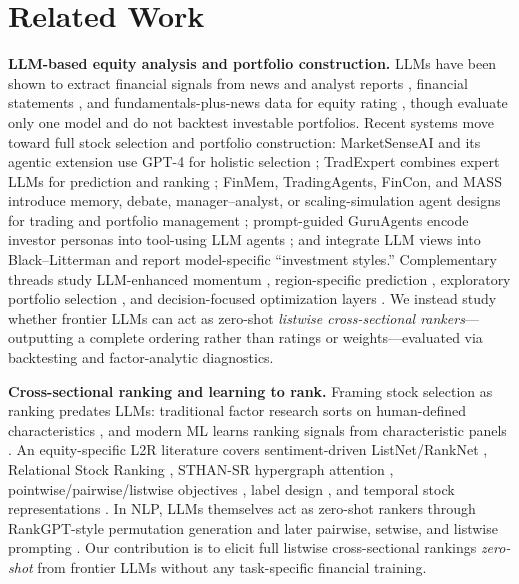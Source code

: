 \section{Related Work}

\textbf{LLM-based equity analysis and portfolio construction.}
LLMs have been shown to extract financial signals from news and analyst reports \citep{lopez2023chatgpt,kim2023llmanalysts}, financial statements \citep{kim2024llmforecast}, and fundamentals-plus-news data for equity rating \citep{papasotiriou2024ai}, though \citeauthor{papasotiriou2024ai} evaluate only one model and do not backtest investable portfolios.
Recent systems move toward full stock selection and portfolio construction: MarketSenseAI and its agentic extension use GPT-4 for holistic selection \citep{fatouros2024marketsenseai,fatouros2025marketsenseai2}; TradExpert combines expert LLMs for prediction and ranking \citep{ding2025tradexpert}; FinMem, TradingAgents, FinCon, and MASS introduce memory, debate, manager--analyst, or scaling-simulation agent designs for trading and portfolio management \citep{yu2025finmem,xiao2024tradingagents,yu2024fincon,guo2025mass}; prompt-guided GuruAgents encode investor personas into tool-using LLM agents \citep{kim2025guruagents}; and \citet{lee2025llmbl} integrate LLM views into Black--Litterman and report model-specific ``investment styles.''
Complementary threads study LLM-enhanced momentum \citep{anic2025chatgpt}, region-specific prediction \citep{tan2024llmchina}, exploratory portfolio selection \citep{xie2024wallstreetneophyte,romanko2023chatgptportfolio}, and decision-focused optimization layers \citep{hwang2025dinn,kim2025dsl}.
We instead study whether frontier LLMs can act as zero-shot \emph{listwise cross-sectional rankers}---outputting a complete ordering rather than ratings or weights---evaluated via backtesting and factor-analytic diagnostics.

\textbf{Cross-sectional ranking and learning to rank.}
Framing stock selection as ranking predates LLMs: traditional factor research sorts on human-defined characteristics \citep{fama1993common,jegadeesh1993returns}, and modern ML learns ranking signals from characteristic panels \citep{gu2020empirical,bryzgalova2025forest}.
An equity-specific L2R literature covers sentiment-driven ListNet/RankNet \citep{song2017ltrsentiment}, Relational Stock Ranking \citep{feng2018temporal}, STHAN-SR hypergraph attention \citep{sawhney2021sthan}, pointwise/pairwise/listwise objectives \citep{poh2021learning,zhang2022listwise}, label design \citep{hwang2023stoploss}, and temporal stock representations \citep{hwang2024simstock}.
In NLP, LLMs themselves act as zero-shot rankers through RankGPT-style permutation generation and later pairwise, setwise, and listwise prompting \citep{sun2023rankgpt,qin2024pairwise,zhuang2024setwise,ren2025selfcalibrated}.
Our contribution is to elicit full listwise cross-sectional rankings \emph{zero-shot} from frontier LLMs without any task-specific financial training.

